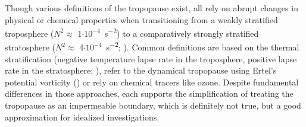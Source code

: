 Though various definitions of the tropopause exist, all rely on abrupt changes in physical or chemical properties when transitioning from a weakly stratified troposphere ($N^2 \approx$ 1$\cdot 10^{-4}$\SI{}{s^{-2}}) to a comparatively strongly stratified stratosphere ($N^2 \approx$ 4$\cdot 10^{-4}$\SI{}{s^{-2}}; \cite{birner_fine-scale_2006}). Common definitions are based on the thermal stratification (negative temperature lapse rate in the troposphere, positive  lapse rate in the stratosphere; \cite{wmo_meteorology_1957}), refer to the dynamical tropopause using Ertel's potential vorticity (\cite{wmo_atmospheric_1986}) or rely on chemical tracers like ozone. Despite fundamental differences in those approaches, each supports the simplification of treating the tropopause as an impermeable boundary, which is definitely not true, but a good approximation for idealized investigations. 

